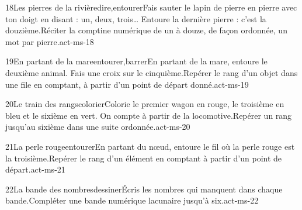\begin{activite}{18}{Les pierres de la rivière}{dire,entourer}{Fais sauter le lapin de pierre en pierre avec ton doigt en disant : un, deux, trois… Entoure la dernière pierre : c’est la {\otBold\color{otNavy}douzième}.}{Réciter la comptine numérique de un à douze, de façon ordonnée, un mot par pierre.}{act-ms-18}
\end{activite}
\begin{activite}{19}{En partant de la mare}{entourer,barrer}{En partant de la mare, entoure le {\otBold\color{otNavy}deuxième} animal. Fais une croix sur le {\otBold\color{otNavy}cinquième}.}{Repérer le rang d’un objet dans une file en comptant, à partir d’un point de départ donné.}{act-ms-19}
\end{activite}
\begin{activite}{20}{Le train des rangs}{colorier}{Colorie le {\otBold\color{otNavy}premier} wagon en rouge, le {\otBold\color{otNavy}troisième} en bleu et le {\otBold\color{otNavy}sixième} en vert. On compte à partir de la locomotive.}{Repérer un rang jusqu’au sixième dans une suite ordonnée.}{act-ms-20}
\end{activite}
\begin{activite}{21}{La perle rouge}{entourer}{En partant du nœud, entoure le fil où la perle rouge est la {\otBold\color{otNavy}troisième}.}{Repérer le rang d’un élément en comptant à partir d’un point de départ.}{act-ms-21}
\end{activite}
\begin{activite}{22}{La bande des nombres}{dessiner}{Écris les nombres qui {\otBold\color{otNavy}manquent} dans chaque bande.}{Compléter une bande numérique lacunaire jusqu’à six.}{act-ms-22}
\end{activite}
